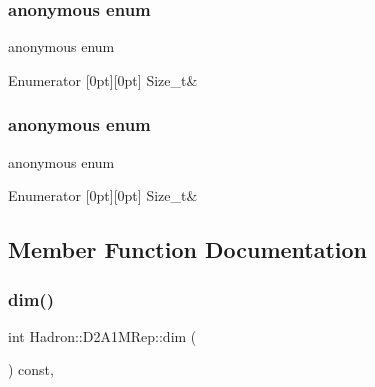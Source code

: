 \subsubsection{\texorpdfstring{anonymous enum}{anonymous enum}}
{\footnotesize\ttfamily anonymous enum}

\begin{DoxyEnumFields}{Enumerator}
[0pt][0pt]{}\mbox{\label{structHadron_1_1D2A1MRep_a67c170b10d639223a1b7cdba1c8eaa29a02ba0ed5b047cc4d98ce5ce24353d74b}} 
Size\+\_\+t&\\
\hline

\end{DoxyEnumFields}
\mbox{\label{structHadron_1_1D2A1MRep_a67c170b10d639223a1b7cdba1c8eaa29}} 
\subsubsection{\texorpdfstring{anonymous enum}{anonymous enum}}
{\footnotesize\ttfamily anonymous enum}

\begin{DoxyEnumFields}{Enumerator}
[0pt][0pt]{}\mbox{\label{structHadron_1_1D2A1MRep_a67c170b10d639223a1b7cdba1c8eaa29a02ba0ed5b047cc4d98ce5ce24353d74b}} 
Size\+\_\+t&\\
\hline

\end{DoxyEnumFields}


\subsection{Member Function Documentation}
\mbox{\label{structHadron_1_1D2A1MRep_a2a6e259c17f5c9b6c35271b8b25ecfab}} 
\subsubsection{\texorpdfstring{dim()}{dim()}\hspace{0.1cm}{\footnotesize\ttfamily [1/2]}}
{\footnotesize\ttfamily int Hadron\+::\+D2\+A1\+M\+Rep\+::dim (\begin{DoxyParamCaption}{ }\end{DoxyParamCaption}) const\hspace{0.3cm}{\ttfamily [inline]}, {\ttfamily [virtual]}}

